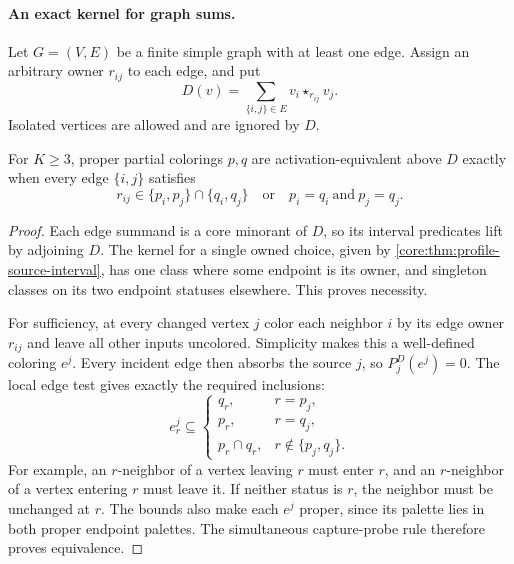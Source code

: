 \paragraph{An exact kernel for graph sums.}
Let $G=(V,E)$ be a finite simple graph with at least one edge.
Assign an arbitrary owner $r_{ij}$ to each edge, and put
\[
 D(v)=\sum_{\{i,j\}\in E}v_i\star_{r_{ij}}v_j.
\]
Isolated vertices are allowed and are ignored by $D$.

\begin{theorem}
\label{core:thm:graph-activation-kernel}
For $K\geq3$, proper partial colorings $p,q$ are activation-equivalent
above $D$ exactly when every edge $\{i,j\}$ satisfies
\[
 r_{ij}\in\{p_i,p_j\}\cap\{q_i,q_j\}
 \quad\text{or}\quad p_i=q_i\ \text{and}\ p_j=q_j.
\]
\end{theorem}
\begin{proof}
Each edge summand is a core minorant of $D$, so its interval
predicates lift by adjoining $D$. The kernel for a single owned
choice, given by \cref{core:thm:profile-source-interval}, has one
class where some endpoint is its owner, and singleton classes on
its two endpoint statuses elsewhere. This proves necessity.

For sufficiency, at every changed vertex $j$ color each neighbor $i$ by its edge
owner $r_{ij}$ and leave all other inputs uncolored. Simplicity
makes this a well-defined coloring $e^j$. Every incident edge then
absorbs the source $j$, so $P_j^D(e^j)=0$.
The local edge test gives exactly the required inclusions:
\[
 e^j_r\subseteq
 \begin{cases}
 q_r,&r=p_j,\\
 p_r,&r=q_j,\\
 p_r\cap q_r,&r\notin\{p_j,q_j\}.
 \end{cases}
\]
For example, an $r$-neighbor of a vertex leaving $r$ must enter
$r$, and an $r$-neighbor of a vertex entering $r$ must leave it.
If neither status is $r$, the neighbor must be unchanged at $r$.
The bounds also make each $e^j$ proper, since its palette lies in
both proper endpoint palettes. The simultaneous capture-probe rule
therefore proves equivalence.
\end{proof}

